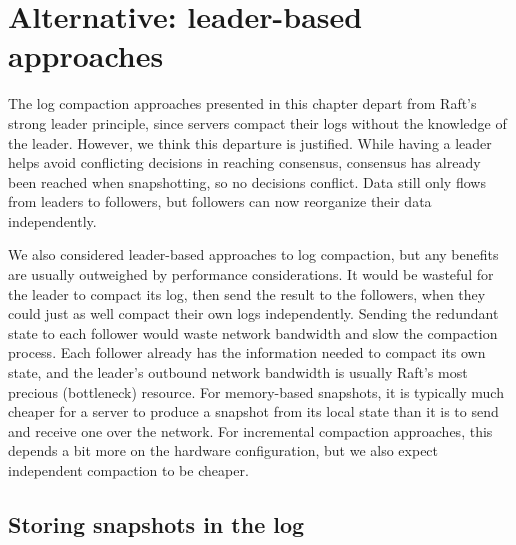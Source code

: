 \section{Alternative: leader-based approaches}
\label{compaction:leader}

The log compaction approaches presented in this chapter depart from Raft's
strong leader principle, since servers compact their logs without the
knowledge of the leader. However, we think this departure is justified.
While having a leader helps avoid conflicting decisions in reaching
consensus, consensus has already been reached when snapshotting, so no
decisions conflict. Data still only flows from leaders to followers,
but followers can now reorganize their data independently.

We also considered leader-based approaches to log compaction, but any
benefits are usually outweighed by performance considerations.
It would be wasteful for the leader to compact its log, then send the result
to the followers, when they could just as well compact their own logs
independently.
Sending the redundant state to each follower would waste network
bandwidth and slow the compaction process. Each follower already has the
information needed to compact its own state, and the leader's outbound
network bandwidth is usually Raft's most precious (bottleneck) resource.
For memory-based snapshots, it is typically much cheaper for a server to
produce a snapshot from its local state than it is to send and receive
one over the network. For incremental compaction approaches, this depends
a bit more on the hardware configuration, but we also expect independent
compaction to be cheaper.

\subsection{Storing snapshots in the log}

